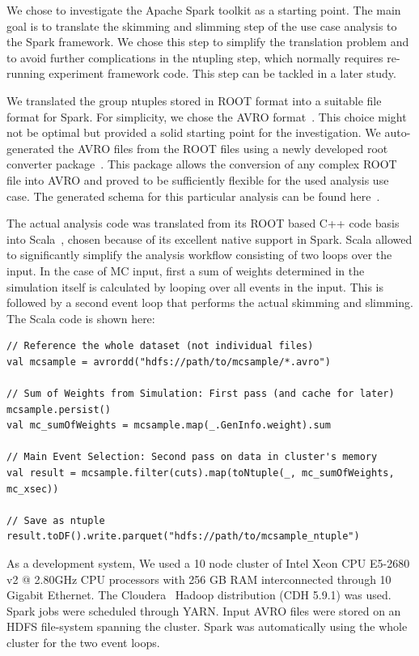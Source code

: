 \documentclass[a4paper]{jpconf}
\begin{document}
We chose to investigate the Apache Spark toolkit as a starting point. The main goal is to translate the skimming and slimming step of the use case analysis to the Spark framework. We chose this step to simplify the translation problem and to avoid further complications in the ntupling step, which normally requires re-running experiment framework code. This step can be tackled in a later study.

We translated the group ntuples stored in ROOT format into a suitable file format for Spark. For simplicity, we chose the AVRO format~\cite{avro}. This choice might not be optimal but provided a solid starting point for the investigation. We auto-generated the AVRO files from the ROOT files using a newly developed root converter package~\cite{rootconverter}. This package allows the conversion of any complex ROOT file into AVRO and proved to be sufficiently flexible for the used analysis use case. The generated schema for this particular analysis can be found here~\cite{avroschema}.

The actual analysis code was translated from its ROOT based C++ code basis into Scala~\cite{scala}, chosen because of its excellent native support in Spark. Scala allowed to significantly simplify the analysis workflow consisting of two loops over the input. In the case of MC input, first a sum of weights determined in the simulation itself is calculated by looping over all events in the input. This is followed by a second event loop that performs the actual skimming and slimming. The Scala code is shown here:

\begin{verbatim}
// Reference the whole dataset (not individual files)
val mcsample = avrordd("hdfs://path/to/mcsample/*.avro")

// Sum of Weights from Simulation: First pass (and cache for later)
mcsample.persist()
val mc_sumOfWeights = mcsample.map(_.GenInfo.weight).sum

// Main Event Selection: Second pass on data in cluster's memory
val result = mcsample.filter(cuts).map(toNtuple(_, mc_sumOfWeights, mc_xsec))

// Save as ntuple
result.toDF().write.parquet("hdfs://path/to/mcsample_ntuple")
\end{verbatim}

As a development system, We used a 10 node cluster of Intel Xeon CPU E5-2680 v2 @ 2.80GHz CPU processors with 256 GB RAM interconnected through 10 Gigabit Ethernet. The Cloudera~\cite{cloudera} Hadoop distribution (CDH 5.9.1) was used. Spark jobs were scheduled through YARN. Input AVRO files were stored on an HDFS file-system spanning the cluster. Spark was automatically using the whole cluster for the two event loops.
\end{document}
